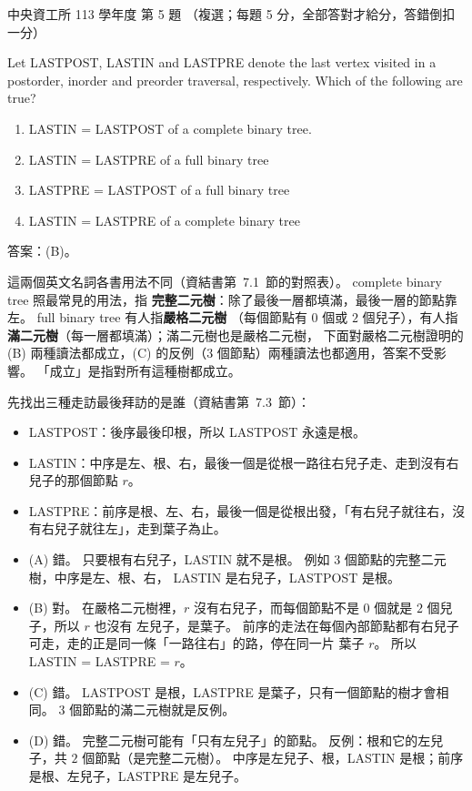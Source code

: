 \begin{pastexam}[label={px:ncu-113-dsa-05}]{中央資工所 113 學年度 第 5 題}
（複選；每題 5 分，全部答對才給分，答錯倒扣一分）

Let LASTPOST, LASTIN and LASTPRE denote the last vertex visited in a postorder, inorder and preorder
traversal, respectively. Which of the following are true?
\begin{enumerate}[label=(\Alph*)]
\item LASTIN = LASTPOST of a complete binary tree.
\item LASTIN = LASTPRE of a full binary tree
\item LASTPRE = LASTPOST of a full binary tree
\item LASTIN = LASTPRE of a complete binary tree
\end{enumerate}
\end{pastexam}

\begin{pastsoln}
答案：(B)。

這兩個英文名詞各書用法不同（資結書第~7.1~節的對照表）。 complete binary tree 照最常見的用法，指
\textbf{完整二元樹}：除了最後一層都填滿，最後一層的節點靠左。 full binary tree 有人指\textbf{嚴格二元樹}
（每個節點有 $0$ 個或 $2$ 個兒子），有人指\textbf{滿二元樹}（每一層都填滿）；滿二元樹也是嚴格二元樹，
下面對嚴格二元樹證明的 (B) 兩種讀法都成立，(C) 的反例（$3$ 個節點）兩種讀法也都適用，答案不受影響。
「成立」是指對所有這種樹都成立。

先找出三種走訪最後拜訪的是誰（資結書第~7.3~節）：
\begin{itemize}
\item LASTPOST：後序最後印根，所以 LASTPOST 永遠是根。
\item LASTIN：中序是左、根、右，最後一個是從根一路往右兒子走、走到沒有右兒子的那個節點 $r$。
\item LASTPRE：前序是根、左、右，最後一個是從根出發，「有右兒子就往右，沒有右兒子就往左」，走到葉子為止。
\end{itemize}

\begin{itemize}
\item (A) 錯。 只要根有右兒子，LASTIN 就不是根。 例如 $3$ 個節點的完整二元樹，中序是左、根、右，
LASTIN 是右兒子，LASTPOST 是根。
\item (B) 對。 在嚴格二元樹裡，$r$ 沒有右兒子，而每個節點不是 $0$ 個就是 $2$ 個兒子，所以 $r$ 也沒有
左兒子，是葉子。 前序的走法在每個內部節點都有右兒子可走，走的正是同一條「一路往右」的路，停在同一片
葉子 $r$。 所以 LASTIN = LASTPRE = $r$。
\item (C) 錯。 LASTPOST 是根，LASTPRE 是葉子，只有一個節點的樹才會相同。 $3$ 個節點的滿二元樹就是反例。
\item (D) 錯。 完整二元樹可能有「只有左兒子」的節點。 反例：根和它的左兒子，共 $2$ 個節點（是完整二元樹）。
中序是左兒子、根，LASTIN 是根；前序是根、左兒子，LASTPRE 是左兒子。
\end{itemize}
\end{pastsoln}
